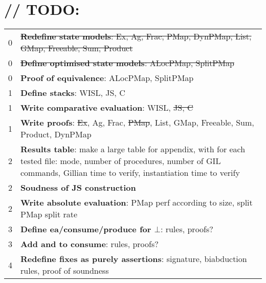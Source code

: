 \chapter{// TODO:}

\begin{tabularx}{\textwidth}{c|X}
	\thead{Priority} & \thead{Name}\\ \hline\hline
	0 & \sout{\textbf{Redefine state models}: Ex, Ag, Frac, PMap, DynPMap, List, GMap, Freeable, Sum, Product} \\ \hline
	0 & \sout{\textbf{Define optimised state models}: ALocPMap, SplitPMap} \\ \hline
	0 & \textbf{Proof of equivalence}: ALocPMap, SplitPMap \\ \hline
	1 & \textbf{Define stacks}: WISL, JS, C \\ \hline
	1 & \textbf{Write comparative evaluation}: WISL, \sout{JS, C} \\ \hline
	1 & \textbf{Write proofs}: \sout{Ex}, Ag, Frac, \sout{PMap}, List, GMap, Freeable, Sum, Product, DynPMap \\ \hline
	2 & \textbf{Results table}: make a large table for appendix, with for each tested file: mode, number of procedures, number of GIL commands, Gillian time to verify, instantiation time to verify \\ \hline
	2 & \textbf{Soudness of JS construction} \\ \hline
	2 & \textbf{Write absolute evaluation}: PMap perf according to size, split PMap split rate \\ \hline
	3 & \textbf{Define ea/consume/produce for $\bot$}: rules, proofs? \\ \hline
	3 & \textbf{Add \LFail{} and \Miss{} to consume}: rules, proofs? \\ \hline
	4 & \textbf{Redefine fixes as purely assertions}: signature, biabduction rules, proof of soundness \\ \hline
\end{tabularx}

\vspace{0.5cm}

